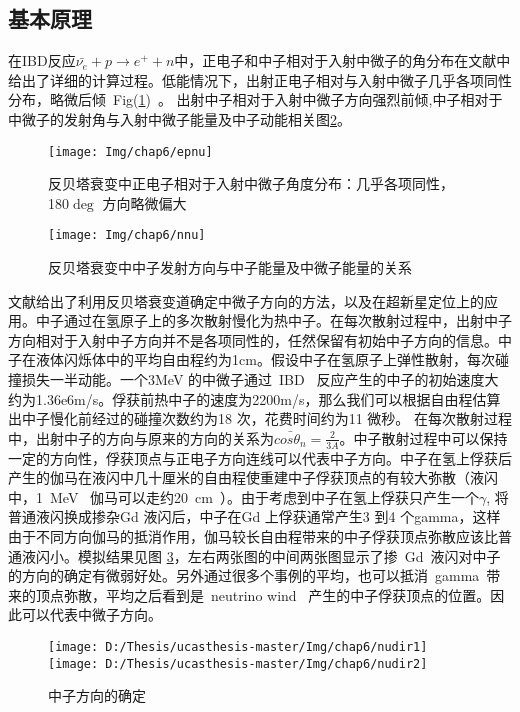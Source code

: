 \subsection{基本原理}
在IBD反应$\bar{\nu_e} + p \rightarrow e^+ + n$中，正电子和中子相对于入射中微子的角分布在文献\citep{vogel1999angular}中给出了详细的计算过程。低能情况下，出射正电子相对与入射中微子几乎各项同性分布，略微后倾~Fig(\ref{fig:epnu})~。 出射中子相对于入射中微子方向强烈前倾,中子相对于中微子的发射角与入射中微子能量及中子动能相关图\ref{fig:nnu}。\\
\begin{figure}[!htbp]
  \centering
   \texttt{[image: Img/chap6/epnu]}
    \caption{反贝塔衰变中正电子相对于入射中微子角度分布：几乎各项同性，180$\deg$ 方向略微偏大}
  \label{fig:epnu}
\end{figure}
\begin{figure}[!htbp]
  \centering
   \texttt{[image: Img/chap6/nnu]}
    \caption{反贝塔衰变中中子发射方向与中子能量及中微子能量的关系}
  \label{fig:nnu}
\end{figure}


文献\citep{apollonio1999determination}给出了利用反贝塔衰变道确定中微子方向的方法，以及在超新星定位上的应用。中子通过在氢原子上的多次散射慢化为热中子。在每次散射过程中，出射中子方向相对于入射中子方向并不是各项同性的，任然保留有初始中子方向的信息。中子在液体闪烁体中的平均自由程约为1cm。假设中子在氢原子上弹性散射，每次碰撞损失一半动能。一个3MeV 的中微子通过~IBD~ 反应产生的中子的初始速度大约为1.36e6m/s。俘获前热中子的速度为2200m/s，那么我们可以根据自由程估算出中子慢化前经过的碰撞次数约为18 次，花费时间约为11 微秒。 在每次散射过程中，出射中子的方向与原来的方向的关系为$\bar{cos\theta_n}=\frac{2}{3A}$。中子散射过程中可以保持一定的方向性，俘获顶点与正电子方向连线可以代表中子方向。中子在氢上俘获后产生的伽马在液闪中几十厘米的自由程使重建中子俘获顶点的有较大弥散（液闪中，1~MeV~ 伽马可以走约20~cm~）。由于考虑到中子在氢上俘获只产生一个$\gamma$, 将普通液闪换成掺杂Gd 液闪后，中子在Gd 上俘获通常产生3 到4 个gamma，这样由于不同方向伽马的抵消作用，伽马较长自由程带来的中子俘获顶点弥散应该比普通液闪小。模拟结果见图
\ref{fig:pgdls}，左右两张图的中间两张图显示了掺~Gd~液闪对中子的方向的确定有微弱好处。另外通过很多个事例的平均，也可以抵消~gamma~带来的顶点弥散，平均之后看到是~neutrino wind~ 产生的中子俘获顶点的位置。因此可以代表中微子方向。
\begin{figure}[!htbp]
  \centering
   \texttt{[image: D:/Thesis/ucasthesis-master/Img/chap6/nudir1]}
   \texttt{[image: D:/Thesis/ucasthesis-master/Img/chap6/nudir2]}
    \caption{中子方向的确定}
  \label{fig:pgdls}
\end{figure}


